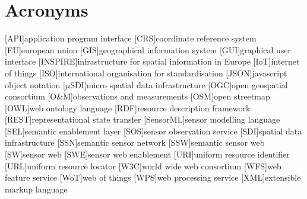 
\chapter*{Acronyms}

\begin{acronym}[UML]
  [API]{application program interface}
  [CRS]{coordinate reference system} 
  [EU]{european union}
  [GIS]{geographical information system}
  [GUI]{graphical user interface}
  [INSPIRE]{infrastructure for spatial information in Europe}
  [IoT]{internet of things}
  [ISO]{international organisation for standardisation}
  [JSON]{javascript object notation}
  [$\mu$SDI]{micro spatial data infrastructure}
  [OGC]{open geospatial consortium}
  [O\&M]{observations and measurements}
  [OSM]{open streetmap}
  [OWL]{web ontology language}
  [RDF]{resource description framework}
  [REST]{representational state transfer}
  [SensorML]{sensor modelling language}
  [SEL]{semantic enablement layer}
  [SOS]{sensor observation service}
  [SDI]{spatial data infrastructure}
  [SSN]{semantic sensor network}
  [SSW]{semantic sensor web}
  [SW]{sensor web}
  [SWE]{sensor web enablement}
  [URI]{uniform resource identifier}
  [URL]{uniform resource locator}
  [W3C]{world wide web consortium}
  [WFS]{web feature service}
  [WoT]{web of things}
  [WPS]{web processing service}
  [XML]{extensible markup language}
\end{acronym}
